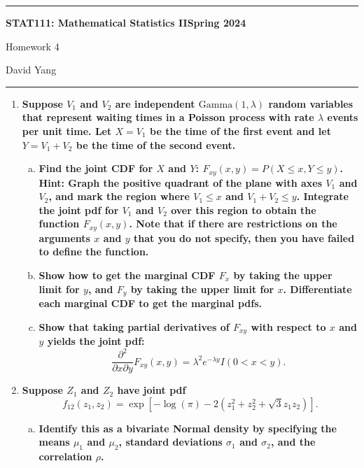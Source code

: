 \documentclass[11pt]{article}
\begin{document}
	\hrule
	\begin{center}
        \textbf{STAT111: Mathematical Statistics II}\hfill \textbf{Spring 2024}\newline

		{\Large Homework 4}

		David Yang
	\end{center}

\hrule

\vspace{1em}

\begin{enumerate}
    \item \textbf{Suppose $V_1$ and $V_2$ are independent $\mathrm{Gamma}(1, \lambda)$ random variables that represent waiting
    times in a Poisson process with rate $\lambda$ events per unit time. Let $X = V_1$ be the time of the
    first event and let $Y = V_1 + V_2$ be the time of the second event.}

    \begin{enumerate}[a)]
      \item \textbf{Find the joint CDF for $X$ and $Y$: $F_{xy}(x, y) = P(X \leq x, Y \leq y)$. Hint: Graph the positive quadrant of the plane
      with axes $V_1$ and $V_2$, and mark the region where $V_1 \leq x$ and $V_1 + V_2 \leq y$. Integrate the joint pdf for $V_1$ and $V_2$ over this region to obtain the function $F_{xy}(x, y)$.
      Note that if there are restrictions on the arguments $x$ and $y$ that you do not specify, then you have failed to define the function.}
      \item \textbf{Show how to get the marginal CDF $F_x$ by taking the upper limit for $y$, and $F_y$ by taking the upper limit for $x$. Differentiate each marginal CDF to get the marginal pdfs.}
      \item \textbf{Show that taking partial derivatives of $F_{xy}$ with respect to $x$ and $y$ yields the joint pdf:}
      \[
        \frac{\partial^2}{\partial x \partial y}F_{xy}(x, y) = \lambda^2 e^{-\lambda y}I(0< x < y). 
      \]
    \end{enumerate}

    \newpage

    \item \textbf{Suppose $Z_1$ and $Z_2$ have joint pdf}
    \[
      f_{12}(z_1, z_2) = \exp \left[ -\log (\pi ) - 2(z_1^2 + z_2^2 + \sqrt{3}z_1 z_2) \right].
    \]
    \begin{enumerate}[a)]
      \item \textbf{Identify this as a bivariate Normal density by specifying the means $\mu_1$ and $\mu_2$, standard deviations $\sigma_1$ and $\sigma_2$, and the correlation $ \rho $.}
      

\end{enumerate}
\end{enumerate}
\end{document}
